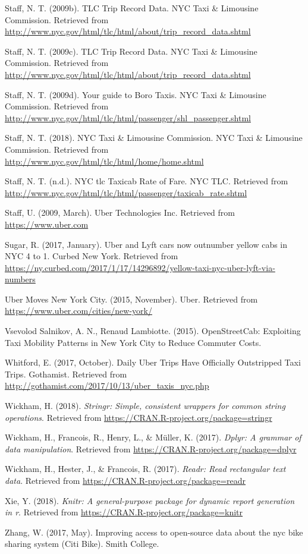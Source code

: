 \documentclass[12pt,twoside]{reedthesis}
\theoremstyle{definition}
\theoremstyle{definition}
\theoremstyle{definition}
\theoremstyle{remark}
\begin{document}
\hypertarget{ref-datayellow}{}
Staff, N. T. (2009b). TLC Trip Record Data. NYC Taxi \& Limousine
Commission. Retrieved from
\url{http://www.nyc.gov/html/tlc/html/about/trip_record_data.shtml}

\hypertarget{ref-datauber}{}
Staff, N. T. (2009c). TLC Trip Record Data. NYC Taxi \& Limousine
Commission. Retrieved from
\url{http://www.nyc.gov/html/tlc/html/about/trip_record_data.shtml}

\hypertarget{ref-greentaxi}{}
Staff, N. T. (2009d). Your guide to Boro Taxis. NYC Taxi \& Limousine
Commission. Retrieved from
\url{http://www.nyc.gov/html/tlc/html/passenger/shl_passenger.shtml}

\hypertarget{ref-nyctlc}{}
Staff, N. T. (2018). NYC Taxi \& Limousine Commission. NYC Taxi \&
Limousine Commission. Retrieved from
\url{http://www.nyc.gov/html/tlc/html/home/home.shtml}

\hypertarget{ref-tlcfarerate}{}
Staff, N. T. (n.d.). NYC tlc Taxicab Rate of Fare. NYC TLC. Retrieved
from \url{http://www.nyc.gov/html/tlc/html/passenger/taxicab_rate.shtml}

\hypertarget{ref-uberweb}{}
Staff, U. (2009, March). Uber Technologies Inc. Retrieved from
\url{https://www.uber.com}

\hypertarget{ref-sugar2017}{}
Sugar, R. (2017, January). Uber and Lyft cars now outnumber yellow cabs
in NYC 4 to 1. Curbed New York. Retrieved from
\url{https://ny.curbed.com/2017/1/17/14296892/yellow-taxi-nyc-uber-lyft-via-numbers}

\hypertarget{ref-ubernyc}{}
Uber Moves New York City. (2015, November). Uber. Retrieved from
\url{https://www.uber.com/cities/new-york/}

\hypertarget{ref-guerrini2015}{}
Vsevolod Salnikov, A. N., Renaud Lambiotte. (2015). OpenStreetCab:
Exploiting Taxi Mobility Patterns in New York City to Reduce Commuter
Costs.

\hypertarget{ref-emma2017}{}
Whitford, E. (2017, October). Daily Uber Trips Have Officially
Outstripped Taxi Trips. Gothamist. Retrieved from
\url{http://gothamist.com/2017/10/13/uber_taxis_nyc.php}

\hypertarget{ref-pkgstringr}{}
Wickham, H. (2018). \emph{Stringr: Simple, consistent wrappers for
common string operations}. Retrieved from
\url{https://CRAN.R-project.org/package=stringr}

\hypertarget{ref-pkgdplyr}{}
Wickham, H., Francois, R., Henry, L., \& Müller, K. (2017). \emph{Dplyr:
A grammar of data manipulation}. Retrieved from
\url{https://CRAN.R-project.org/package=dplyr}

\hypertarget{ref-pkgreadr}{}
Wickham, H., Hester, J., \& Francois, R. (2017). \emph{Readr: Read
rectangular text data}. Retrieved from
\url{https://CRAN.R-project.org/package=readr}

\hypertarget{ref-pkgknitr}{}
Xie, Y. (2018). \emph{Knitr: A general-purpose package for dynamic
report generation in r}. Retrieved from
\url{https://CRAN.R-project.org/package=knitr}

\hypertarget{ref-zhang2017}{}
Zhang, W. (2017, May). Improving access to open-source data about the
nyc bike sharing system (Citi Bike). Smith College.


\end{document}
